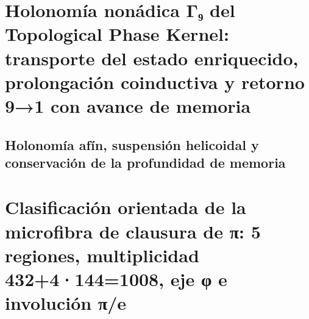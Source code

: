 \chapter{Holonomía nonádica Γ₉ del Topological Phase Kernel: transporte del estado enriquecido, prolongación coinductiva y retorno 9→1 con avance de memoria}
\label{chap:sucesor-102-08}
\label{owner:sucesor-102-20-arquitectura-desarrollo-holonomico}
\label{owner:sucesor-102-u008-u010-unicos}

\begin{HMTScientificOwnerSubordinated}
\let\HMTLabelBeforeOwnerSixD\label
\renewcommand{\label}[1]{%
  \ifstrequal{#1}{thm:eje-espejo-nonadico}%
    {\HMTLabelBeforeOwnerSixD{owner06d:thm:eje-espejo-nonadico}}%
    {\HMTLabelBeforeOwnerSixD{#1}}%
}

\end{HMTScientificOwnerSubordinated}

\section{Holonomía afín, suspensión helicoidal y conservación de la profundidad de memoria}
\begin{HMTSpiralIntegratedBody}

\end{HMTSpiralIntegratedBody}


\chapter{Clasificación orientada de la microfibra de clausura de π: 5 regiones, multiplicidad 432+4·144=1008, eje φ e involución π/e}
\label{chap:sucesor-102-09}


